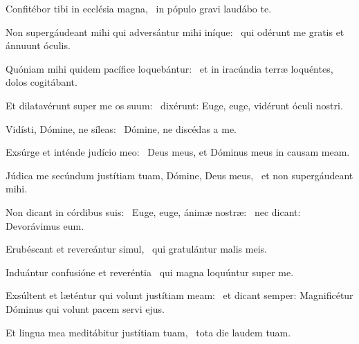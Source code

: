 
\item Confitébor tibi in ecclésia magna,~\psstar{} in pópulo gravi laudábo te.

\item Non supergáudeant mihi qui adversántur mihi iníque:~\psstar{} qui odérunt me gratis et ánnuunt óculis.

\item Quóniam mihi quidem pacífice loquebántur:~\psstar{} et in iracúndia terræ loquéntes, dolos cogitábant.

\item Et dilatavérunt super me os suum:~\psstar{} dixérunt: Euge, euge, vidérunt óculi nostri.

\item Vidísti, Dómine, ne síleas:~\psstar{} Dómine, ne discédas a me.

\item Exsúrge et inténde judício meo:~\psstar{} Deus meus, et Dóminus meus in causam meam.

\item Júdica me secúndum justítiam tuam, Dómine, Deus meus,~\psstar{} et non supergáudeant mihi.

\item Non dicant in córdibus suis:~\pscross{} Euge, euge, ánimæ nostræ:~\psstar{} nec dicant: Devorávimus eum.

\item Erubéscant et revereántur simul,~\psstar{} qui gratulántur malis meis.

\item Induántur confusióne et reveréntia~\psstar{} qui magna loquúntur super me.

\item Exsúltent et læténtur qui volunt justítiam meam:~\psstar{} et dicant semper: Magnificétur Dóminus qui volunt pacem servi ejus.

\item Et lingua mea meditábitur justítiam tuam,~\psstar{} tota die laudem tuam.